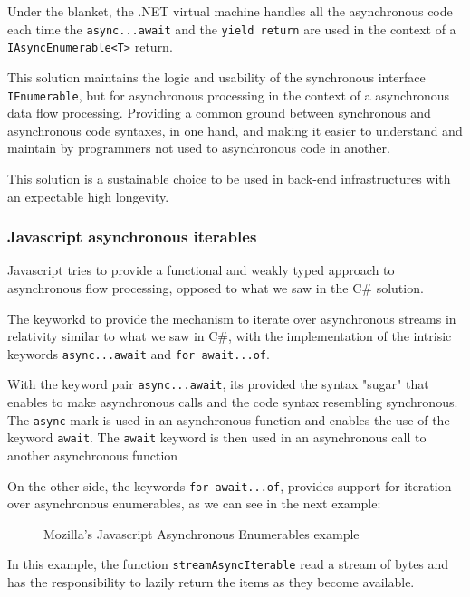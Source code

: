 	Under the blanket, the .NET virtual machine handles all the asynchronous code each time the \texttt{async...await} and the \texttt{yield return} are used in the context of a \texttt{IAsyncEnumerable<T>} return.

	This solution maintains the logic and usability of the synchronous interface \texttt{IEnumerable}, but for asynchronous processing in the context of a asynchronous data flow processing. 
	Providing a common ground between synchronous and asynchronous code syntaxes, in one hand, and making it easier to understand and maintain by programmers not used to asynchronous code in another.
	
	This solution is a sustainable choice to be used in back-end infrastructures with an expectable high longevity.

\subsubsection{Javascript asynchronous iterables}
\label{jsae}
	Javascript tries to provide a functional and weakly typed approach to asynchronous flow processing, opposed to what we saw in the C\# solution.

	The keyworkd to provide the mechanism to iterate over asynchronous streams in relativity similar to what we saw in C\#, with the implementation of the intrisic keywords \texttt{async...await} and \texttt{for await...of}.

	With the keyword pair \texttt{async...await}, its provided the syntax "sugar" that enables to make asynchronous calls and the code syntax resembling synchronous. 
	The \texttt{async} mark is used in an asynchronous function and enables the use of the keyword \texttt{await}. The \texttt{await} keyword is then used in an asynchronous call to another asynchronous function

	On the other side, the keywords \texttt{for await...of}, provides support for iteration over asynchronous enumerables, as we can see in the next example:

\clearpage
	\begin{figure}[H]
		\centering
		\caption{Mozilla's Javascript Asynchronous Enumerables example}
		\label{fig:enumex2}
	\end{figure}
\clearpage

In this example, the function \texttt{streamAsyncIterable} read a stream of bytes and has the responsibility to lazily return the items as they become available.

